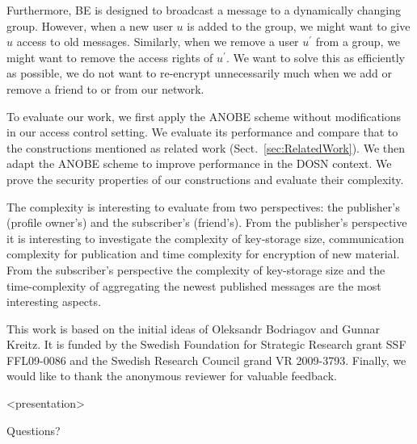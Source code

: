 Furthermore, \ac{BE} is designed to broadcast a message to a dynamically 
changing group.
However, when a new user \(u\) is added to the group, we might want to give 
\(u\) access to old messages.
Similarly, when we remove a user \(u^\prime\) from a group, we might want to 
remove the access rights of \(u^\prime\).
We want to solve this as efficiently as possible, we do not want to re-encrypt 
unnecessarily much when we add or remove a friend to or from our network.


To evaluate our work, we first apply the \ac{ANOBE} scheme without 
modifications in our access control setting.
We evaluate its performance and compare that to the constructions mentioned as 
related work (Sect.~\ref{sec:RelatedWork}).
We then adapt the \ac{ANOBE} scheme to improve performance in the \ac{DOSN} 
context.
We prove the security properties of our constructions and evaluate their 
complexity.

The complexity is interesting to evaluate from two perspectives: the 
publisher's (profile owner's) and the subscriber's (friend's).
From the publisher's perspective it is interesting to investigate the 
complexity of key-storage size, communication complexity for publication and 
time complexity for encryption of new material.
From the subscriber's perspective the complexity of key-storage size and the 
time-complexity of aggregating the newest published messages are the most 
interesting aspects.



This work is based on the initial ideas of Oleksandr Bodriagov and Gunnar 
Kreitz.
It is funded by the Swedish Foundation for Strategic Research grant SSF 
FFL09-0086 and the Swedish Research Council grand VR 2009-3793.
Finally, we would like to thank the anonymous reviewer for valuable feedback.



\begin{frame}<presentation>
  \begin{center}
    Questions?
  \end{center}
\end{frame}
